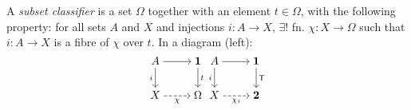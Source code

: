  A \textit{subset classifier} is a set $\Omega$ together with an element $t \in \Omega$, with the following property: for all sets $A$ and $X$ and injections $i \colon A \to X$, $\exists!$ fn. $\chi \colon X \to \Omega$ such that $i \colon A \to X$ is a fibre of $\chi$ over $t$. In a diagram (left):\linebreak
\[\begin{tikzcd}[cramped]
    A & {\mathbf{1}} \\
    X & \Omega
    \arrow[from=1-1, to=1-2]
    \arrow["i"', from=1-1, to=2-1]
    \arrow["t", from=1-2, to=2-2]
    \arrow["\chi"', dashed, from=2-1, to=2-2]
\end{tikzcd}
\begin{tikzcd}[cramped]
    A & {\mathbf{1}} \\
    X & {\mathbf{2}}
    \arrow[from=1-1, to=1-2]
    \arrow["i"', from=1-1, to=2-1]
    \arrow["{\mathsf{T}}", from=1-2, to=2-2]
    \arrow["{\chi_i}"', dashed, from=2-1, to=2-2]
\end{tikzcd}\]

